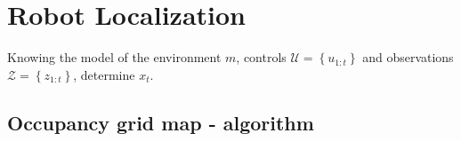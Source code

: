
\chapter{Robot Localization}

{
    Knowing the model of the environment $m$, controls $\mathcal{U}= \left\{u_{1:t}\right\}$ and observations $\mathcal{Z}=\left\{z_{1:t}\right\}$, determine $x_t$.
}


\section{Occupancy grid map - algorithm}

